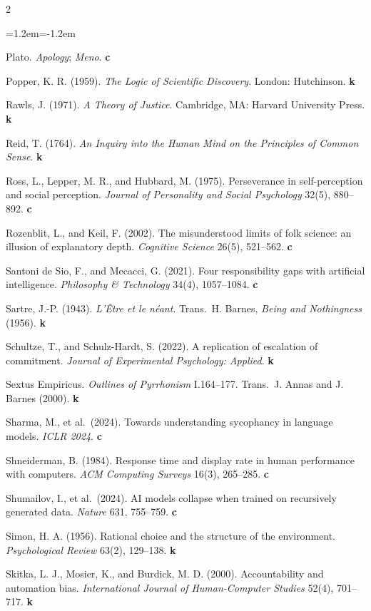 \documentclass[11pt,a4paper]{article}
\newcounter{art}
\begin{document}
\begin{multicols}{2}
\begin{list}{}{\leftmargin=1.2em\itemindent=-1.2em\itemsep=1pt}
\item Plato. \textit{Apology}; \textit{Meno}. \textbf{c}
\item Popper, K. R. (1959). \textit{The Logic of Scientific Discovery}. London: Hutchinson. \textbf{k}
\item Rawls, J. (1971). \textit{A Theory of Justice}. Cambridge, MA: Harvard University Press. \textbf{k}
\item Reid, T. (1764). \textit{An Inquiry into the Human Mind on the Principles of Common Sense}. \textbf{k}
\item Ross, L., Lepper, M. R., and Hubbard, M. (1975). Perseverance in self-perception and social perception. \textit{Journal of Personality and Social Psychology} 32(5), 880--892. \textbf{c}
\item Rozenblit, L., and Keil, F. (2002). The misunderstood limits of folk science: an illusion of explanatory depth. \textit{Cognitive Science} 26(5), 521--562. \textbf{c}
\item Santoni de Sio, F., and Mecacci, G. (2021). Four responsibility gaps with artificial intelligence. \textit{Philosophy \& Technology} 34(4), 1057--1084. \textbf{c}
\item Sartre, J.-P. (1943). \textit{L'Être et le néant}. Trans.\ H. Barnes, \textit{Being and Nothingness} (1956). \textbf{k}
\item Schultze, T., and Schulz-Hardt, S. (2022). A replication of escalation of commitment. \textit{Journal of Experimental Psychology: Applied}. \textbf{k}
\item Sextus Empiricus. \textit{Outlines of Pyrrhonism} I.164--177. Trans.\ J. Annas and J. Barnes (2000). \textbf{k}
\item Sharma, M., et al.\ (2024). Towards understanding sycophancy in language models. \textit{ICLR 2024}. \textbf{c}
\item Shneiderman, B. (1984). Response time and display rate in human performance with computers. \textit{ACM Computing Surveys} 16(3), 265--285. \textbf{c}
\item Shumailov, I., et al.\ (2024). AI models collapse when trained on recursively generated data. \textit{Nature} 631, 755--759. \textbf{c}
\item Simon, H. A. (1956). Rational choice and the structure of the environment. \textit{Psychological Review} 63(2), 129--138. \textbf{k}
\item Skitka, L. J., Mosier, K., and Burdick, M. D. (2000). Accountability and automation bias. \textit{International Journal of Human-Computer Studies} 52(4), 701--717. \textbf{k}

\end{list}
\end{multicols}
\end{document}
